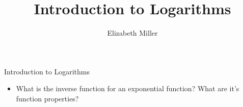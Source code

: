 \documentclass{ximera}
\author{Elizabeth Miller}
\title{Introduction to Logarithms}
\begin{document}
\begin{abstract}
\end{abstract}
\maketitle


\begin{objectives}

\item Introduction to Logarithms
\begin{itemize}
	\item What is the inverse function for an exponential function?  What are it's function properties?
\end{itemize}




\end{objectives}
\end{document}
